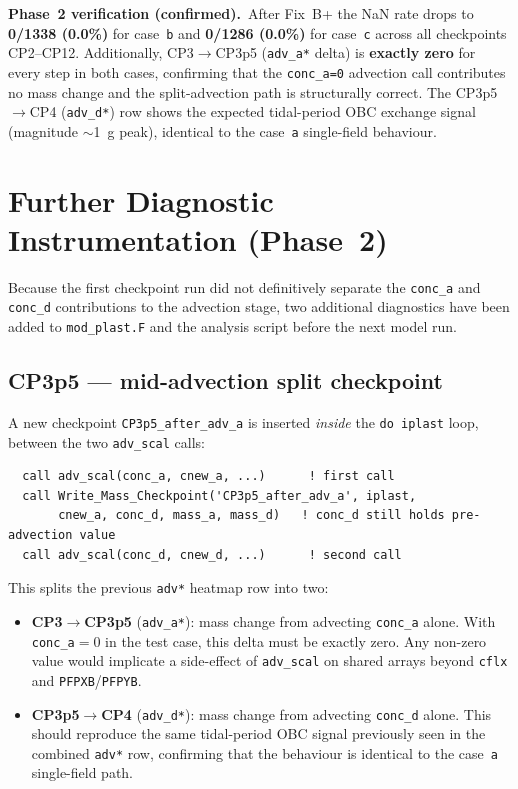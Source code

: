 \documentclass[11pt]{article}
\begin{document}
\textbf{Phase~2 verification (confirmed).}\
After Fix~B+ the NaN rate drops to \textbf{0/1338 (0.0\%)} for case~\texttt{b}
and \textbf{0/1286 (0.0\%)} for case~\texttt{c} across all checkpoints CP2--CP12.
Additionally, CP3$\to$CP3p5 (\texttt{adv\_a*} delta) is \textbf{exactly zero}
for every step in both cases, confirming that the \texttt{conc\_a=0} advection
call contributes no mass change and the split-advection path is structurally
correct.  The CP3p5$\to$CP4 (\texttt{adv\_d*}) row shows the expected
tidal-period OBC exchange signal (magnitude $\sim$1~g peak), identical
to the case~\texttt{a} single-field behaviour.

\section*{Further Diagnostic Instrumentation (Phase~2)}

Because the first checkpoint run did not definitively separate the
\texttt{conc\_a} and \texttt{conc\_d} contributions to the advection stage, two
additional diagnostics have been added to \texttt{mod\_plast.F} and the analysis
script before the next model run.

\subsection*{CP3p5 --- mid-advection split checkpoint}

A new checkpoint \texttt{CP3p5\_after\_adv\_a} is inserted \emph{inside} the
\texttt{do iplast} loop, between the two \texttt{adv\_scal} calls:
\begin{verbatim}
  call adv_scal(conc_a, cnew_a, ...)      ! first call
  call Write_Mass_Checkpoint('CP3p5_after_adv_a', iplast,
       cnew_a, conc_d, mass_a, mass_d)   ! conc_d still holds pre-advection value
  call adv_scal(conc_d, cnew_d, ...)      ! second call
\end{verbatim}
This splits the previous \texttt{adv*} heatmap row into two:
\begin{itemize}
  \item \textbf{CP3$\to$CP3p5} (\texttt{adv\_a*}): mass change from advecting
        \texttt{conc\_a} alone.
        With \texttt{conc\_a}$=0$ in the test case, this delta must be exactly zero.
        Any non-zero value would implicate a side-effect of \texttt{adv\_scal}
        on shared arrays beyond \texttt{cflx} and \texttt{PFPXB}/\texttt{PFPYB}.
  \item \textbf{CP3p5$\to$CP4} (\texttt{adv\_d*}): mass change from advecting
        \texttt{conc\_d} alone.
        This should reproduce the same tidal-period OBC signal previously seen
        in the combined \texttt{adv*} row, confirming that the behaviour is
        identical to the case~\texttt{a} single-field path.
\end{itemize}
\end{document}
